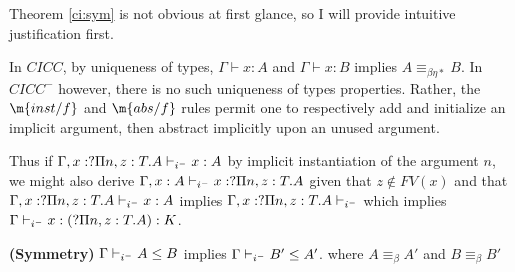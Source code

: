 Theorem \ref{ci:sym} is not obvious at first glance, 
so I will provide intuitive justification first.

In $CICC$, by uniqueness of types, 
$\Gamma \vdash x : A$ and 
$\Gamma \vdash x : B$ implies
$A \equiv_{\beta\eta*} B$.  
In $CICC^{-}$ however, there is no such uniqueness of 
types properties.  
Rather, the $\m{inst/f}$ and $\m{abs/f}$ 
rules permit one to respectively
add and initialize an implicit argument, then
abstract implicitly upon an unused argument. 

Thus if $\Gamma , x : ?\Pi n,z : T . A \vdash_{i^-} x : A$
by implicit instantiation of the argument $n$,
we might also
derive
$\Gamma , x : A \vdash_{i^-} x : ?\Pi n,z : T . A$
given that $z \notin FV(x)$ and that 
$\Gamma , x : ?\Pi n,z : T . A \vdash_{i^-} x : A$ 
implies $ \Gamma , x : ?\Pi n,z : T . A \vdash_{i^-}$ 
which implies $ \Gamma\vdash_{i^-} x : (?\Pi n,z : T . A) : K$.

\begin{theorem}
\textbf{(Symmetry)}
$\Gamma \vdash_{i^-} A \leq B $ implies 
$\Gamma \vdash_{i^-} B' \leq A' $. where $A \equiv_{\beta} A'$ and $B \equiv_{\beta} B'$
\label{ci:sym}
\end{theorem}

